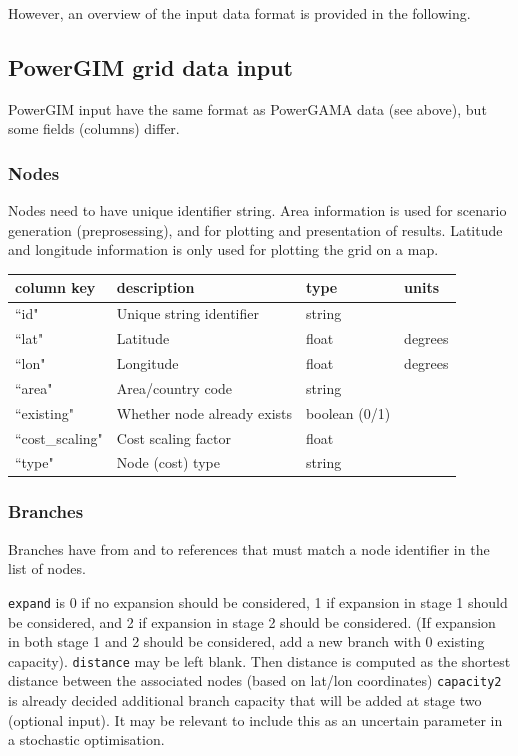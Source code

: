 \documentclass{article}
\begin{document}
However, an overview of the input data format is provided in the following.


\subsection{PowerGIM grid data input}
PowerGIM input have the same format as PowerGAMA data (see above), but some fields (columns) differ.

\subsubsection{Nodes}
Nodes need to have unique identifier string. Area information is used for scenario generation (preprosessing), and for plotting and presentation of results.
Latitude and longitude information is only used for plotting the grid on a map.

\medskip
\begin{tabular}{llll}
	\hline
	column key & description & type & units \\
	\hline
	``id"	&	Unique string identifier 	& string	& \\
	``lat"	&	Latitude				& float 	& degrees \\
	``lon"	&	Longitude				& float	& degrees \\
	``area" &	Area/country code		& string	& \\
	``existing" &	Whether node already exists		& boolean (0/1)	& \\
	``cost\_scaling"	&	Cost scaling factor & float	&  \\
	``type"	&	Node (cost) type & string	&  \\
	\hline
\end{tabular}


\subsubsection{Branches}
Branches have from and to references that must match a node identifier in the list of nodes.

\texttt{expand} is 0 if no expansion should be considered, 1 if expansion in stage 1 should be considered, and 2 if expansion in stage 2 should be considered. (If expansion in both stage 1 and 2 should be considered, add a new branch with 0 existing capacity).
\texttt{distance} may be left blank. Then distance is computed as the shortest distance between the associated nodes (based on lat/lon coordinates)
\texttt{capacity2} is already decided additional branch capacity that will be added at stage two (optional input). It may be relevant to include this as an uncertain parameter in a stochastic optimisation.
\end{document}

